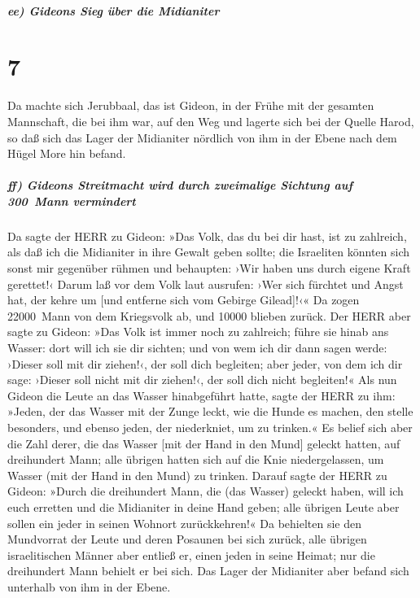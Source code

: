 \hypertarget{ee-gideons-sieg-uxfcber-die-midianiter}{%
\subparagraph{ee) Gideons Sieg über die
Midianiter}\label{ee-gideons-sieg-uxfcber-die-midianiter}}

\hypertarget{section-6}{%
\section{7}\label{section-6}}

Da machte sich Jerubbaal, das ist Gideon, in der Frühe mit
der gesamten Mannschaft, die bei ihm war, auf den Weg und lagerte sich
bei der Quelle Harod, so daß sich das Lager der Midianiter nördlich von
ihm in der Ebene nach dem Hügel More hin befand.

\hypertarget{ff-gideons-streitmacht-wird-durch-zweimalige-sichtung-auf-300-mann-vermindert}{%
\subparagraph{ff) Gideons Streitmacht wird durch zweimalige Sichtung auf
300~Mann
vermindert}\label{ff-gideons-streitmacht-wird-durch-zweimalige-sichtung-auf-300-mann-vermindert}}

Da sagte der HERR zu Gideon: »Das Volk, das du bei dir
hast, ist zu zahlreich, als daß ich die Midianiter in ihre Gewalt geben
sollte; die Israeliten könnten sich sonst mir gegenüber rühmen und
behaupten: ›Wir haben uns durch eigene Kraft gerettet!‹
Darum laß vor dem Volk laut ausrufen: ›Wer sich fürchtet
und Angst hat, der kehre um {[}und entferne sich vom Gebirge
Gilead{]}!‹« Da zogen 22000~Mann von dem Kriegsvolk ab, und 10000
blieben zurück. Der HERR aber sagte zu Gideon: »Das Volk
ist immer noch zu zahlreich; führe sie hinab ans Wasser: dort will ich
sie dir sichten; und von wem ich dir dann sagen werde: ›Dieser soll mit
dir ziehen!‹, der soll dich begleiten; aber jeder, von dem ich dir sage:
›Dieser soll nicht mit dir ziehen!‹, der soll dich nicht begleiten!«
Als nun Gideon die Leute an das Wasser hinabgeführt hatte,
sagte der HERR zu ihm: »Jeden, der das Wasser mit der Zunge leckt, wie
die Hunde es machen, den stelle besonders, und ebenso jeden, der
niederkniet, um zu trinken.« Es belief sich aber die Zahl
derer, die das Wasser {[}mit der Hand in den Mund{]} geleckt hatten, auf
dreihundert Mann; alle übrigen hatten sich auf die Knie niedergelassen,
um Wasser (mit der Hand in den Mund) zu trinken. Darauf
sagte der HERR zu Gideon: »Durch die dreihundert Mann, die (das Wasser)
geleckt haben, will ich euch erretten und die Midianiter in deine Hand
geben; alle übrigen Leute aber sollen ein jeder in seinen Wohnort
zurückkehren!« Da behielten sie den Mundvorrat der Leute
und deren Posaunen bei sich zurück, alle übrigen israelitischen Männer
aber entließ er, einen jeden in seine Heimat; nur die dreihundert Mann
behielt er bei sich. Das Lager der Midianiter aber befand sich unterhalb
von ihm in der Ebene.

